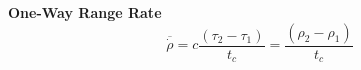 
\textbf{One-Way Range Rate}
\begin{equation}
    \overline{\dot{\rho}} = c\frac{(\tau_2-\tau_1)}{t_c}=\frac{(\rho_2-\rho_1)}{t_c}
\end{equation}


%
%
%
%
%
%
%
%
